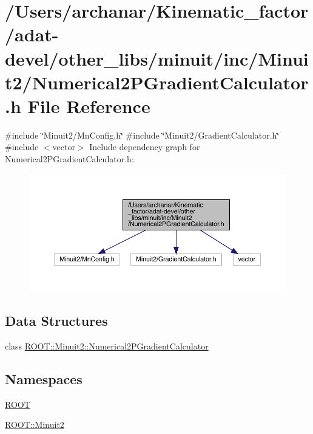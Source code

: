 \hypertarget{adat-devel_2other__libs_2minuit_2inc_2Minuit2_2Numerical2PGradientCalculator_8h}{}\section{/\+Users/archanar/\+Kinematic\+\_\+factor/adat-\/devel/other\+\_\+libs/minuit/inc/\+Minuit2/\+Numerical2\+P\+Gradient\+Calculator.h File Reference}
\label{adat-devel_2other__libs_2minuit_2inc_2Minuit2_2Numerical2PGradientCalculator_8h}
{\ttfamily \#include \char`\"{}Minuit2/\+Mn\+Config.\+h\char`\"{}}\newline
{\ttfamily \#include \char`\"{}Minuit2/\+Gradient\+Calculator.\+h\char`\"{}}\newline
{\ttfamily \#include $<$vector$>$}\newline
Include dependency graph for Numerical2\+P\+Gradient\+Calculator.\+h\+:
\nopagebreak
\begin{figure}[H]
\begin{center}
\leavevmode
\includegraphics[width=350pt]{d4/d14/adat-devel_2other__libs_2minuit_2inc_2Minuit2_2Numerical2PGradientCalculator_8h__incl}
\end{center}
\end{figure}
\subsection*{Data Structures}
\begin{DoxyCompactItemize}
\item 
class \mbox{\hyperlink{classROOT_1_1Minuit2_1_1Numerical2PGradientCalculator}{R\+O\+O\+T\+::\+Minuit2\+::\+Numerical2\+P\+Gradient\+Calculator}}
\end{DoxyCompactItemize}
\subsection*{Namespaces}
\begin{DoxyCompactItemize}
\item 
 \mbox{\hyperlink{namespaceROOT}{R\+O\+OT}}
\item 
 \mbox{\hyperlink{namespaceROOT_1_1Minuit2}{R\+O\+O\+T\+::\+Minuit2}}
\end{DoxyCompactItemize}

